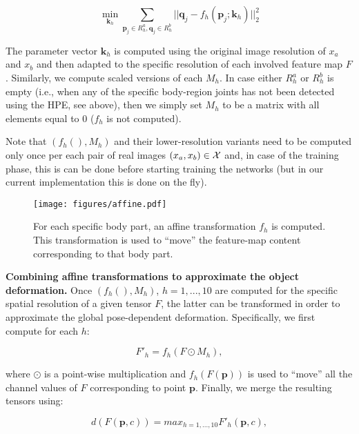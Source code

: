 \documentclass[10pt,twocolumn,letterpaper]{article}
\begin{document}
\begin{equation}
\min_{\mathbf{k}_h} \sum_{\mathbf{p}_j \in R_h^a, \mathbf{q}_j \in R_h^b} || \mathbf{q}_j - f_h(\mathbf{p}_j ; \mathbf{k}_h) ||^2_2
\end{equation}

The parameter vector 
$\mathbf{k}_h$ is computed using the original image resolution of $x_a$ and $x_b$ and then adapted to the specific resolution of each involved  feature map $F$.
Similarly, we compute scaled versions of each $M_h$.
In case either $R_h^a$ or $R_h^b$ is empty (i.e., when any of the specific body-region joints has not been detected using the HPE, see above), then we simply set   $M_h$ to be a matrix with all elements equal to 0 ($f_h$ is not computed).

 Note that  $(f_h(), M_h)$ and their lower-resolution variants need to be computed 
only once  per each pair of real images $(x_a, x_b) \in {\cal X}$ and, in case of the training phase, this is can be done before starting training the networks (but in our current implementation this is done on the fly).

\begin{figure}[t!]\centering
\texttt{[image: figures/affine.pdf]}
\caption{For each specific body part, an  affine transformation $f_h$  is computed. This transformation is  used to ``move'' the feature-map content corresponding to that body part.}
\label{fig:affinepipeline}
\end{figure}

{\bf Combining affine transformations to approximate the  object deformation.} 
Once $(f_h(), M_h)$, $h= 1, ...,10$ are computed for the specific spatial resolution of a given tensor $F$, the latter can be transformed in order to approximate the global pose-dependent deformation.
Specifically, we first compute for each $h$:

\begin{equation}
F'_h = f_h (F \odot M_h),
\end{equation}


\noindent
where $\odot$ is a point-wise multiplication
and $f_h(F(\mathbf{p}))$ is used to ``move'' all the channel values of $F$ corresponding to point 
$\mathbf{p}$.
Finally, we merge the resulting  tensors using:

\begin{equation}
\label{eq.d-F}
d(F(\mathbf{p},c)) = max_{h = 1, ..., 10} F'_h(\mathbf{p},c),
\end{equation}
\end{document}
